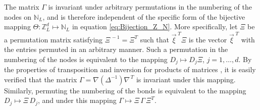 \documentclass{cmslatex}
\begin{document}
The matrix $\Gamma$ is invariant under arbitrary permutations in the
numbering of the nodes on $\mathbb{N}_L$, and is therefore independent
of the specific form of the bijective mapping
$\Theta:\mathbb{Z}_L^d\mapsto\mathbb{N}_L$ in equation 
\eqref{eq:Bijection_Z_N}. More specifically, let $\Xi$ be a permutation
matrix satisfying $\Xi^{\,-1}=\Xi^T$ such that $\vec{\xi}^{\; T}\Xi$ is the vector
$\vec{\xi}^{\; T}$ with the entries permuted in an arbitrary manner. Such
a permutation in the numbering of the nodes is equivalent to the
mapping $D_j\mapsto D_j\Xi$, $j=1,\ldots,d$. By the properties of transposition and
inversion for products of matrices \cite{Horn_Johnson-1990}, it is
easily verified that the matrix $\Gamma=\nabla(\Delta^{-1})\nabla^{\,T}$ is invariant under this mapping. Similarly,
permuting the numbering of the bonds is equivalent to the mapping
$D_j\mapsto \Xi\,D_j$, and under this mapping $\Gamma\mapsto \Xi\,\Gamma\, \Xi^T$.
\end{document}
